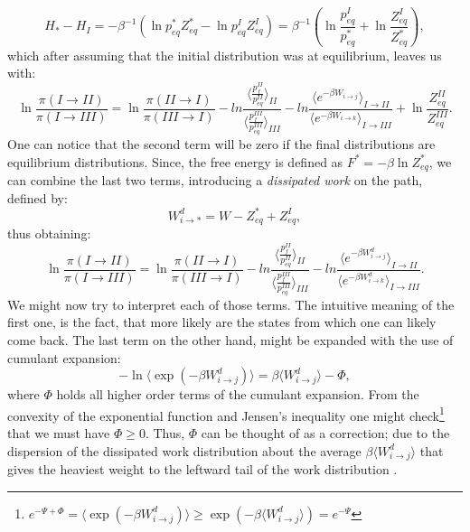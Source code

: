 \documentclass[a4paper,12pt]{article}
\begin{document}
\begin{equation}
  H_*-H_I= -\beta^{-1}( \ln{p_{eq}^* Z_{eq}^*} -  \ln{p_{eq}^I Z_{eq}^I})= \beta^{-1}( \ln{\frac{p_{eq}^I}{p_{eq}^*}} + \ln{\frac{Z_{eq}^I}{Z_{eq}^*}}),
\end{equation}
which after assuming that the initial distribution was at equilibrium, leaves us with:
\begin{equation}
  \ln \frac{\pi(I \to II)}{\pi(I \to III)} =
  \ln \frac{\pi(II \to I)}{\pi(III \to I)} - ln \frac{ \langle \frac{p_{f}^{II}}{p_{eq}^{II}}  \rangle_{II}}{ \langle \frac{p_{f}^{III}}{p_{eq}^{III}}  \rangle_{III} }
  -ln \frac{\langle e^{ - \beta W_{i \to j}} \rangle_{I \to II}}{\langle e^{ - \beta W_{i \to k}} \rangle_{I \to III}} + \ln{\frac{Z_{eq}^{II}}{Z_{eq}^{III} }}.
\end{equation}
One can notice that the second term will be zero if the final distributions are equilibrium distributions. Since, the free energy is defined as $F^* = -\beta \ln Z_{eq}^*$, we can combine the last two terms, introducing a \textit{dissipated work} on the path, defined by:
\begin{equation}
  W_{i \to *}^d =W - Z_{eq}^* + Z_{eq}^I,
\end{equation}
thus obtaining:
\begin{equation}
  \ln \frac{\pi(I \to II)}{\pi(I \to III)} =
  \ln \frac{\pi(II \to I)}{\pi(III \to I)} - ln \frac{ \langle \frac{p_{f}^{II}}{p_{eq}^{II}}  \rangle_{II}}{ \langle \frac{p_{f}^{III}}{p_{eq}^{III}}  \rangle_{III} }
  -ln \frac{\langle e^{ - \beta W^d_{i \to j}} \rangle_{I \to II}}{\langle e^{ - \beta W^d_{i \to k}} \rangle_{I \to III}}.
\end{equation}
We might now try to interpret each of those terms. The intuitive meaning of the first one, is the fact, that more likely are the states from which one can likely come back. The last term on the other hand, might be expanded with the use of cumulant expansion:
\begin{equation}
  -\ln \langle \exp(-\beta W^d_{i \to j})\rangle= \beta \langle W^d_{i \to j} \rangle - \Phi,
\end{equation} 
where $\Phi$ holds all higher order terms of the cumulant expansion. From the convexity of the exponential function and Jensen's inequality one might check\footnote{$e^{-\Psi + \Phi}=\langle \exp(-\beta W^d_{i \to j}) \rangle \geq \exp(-\beta \langle W^d_{i \to j} \rangle)= e^{-\Psi}$} that we must have $\Phi \geq 0$. Thus, $\Phi$ can be thought of as a correction; due to the dispersion of the dissipated work distribution about the average $\beta \langle W^d_{i \to j} \rangle $ that gives the heaviest weight to the leftward tail of the work distribution \cite{Jarzynski:2006cq}.
\end{document}
